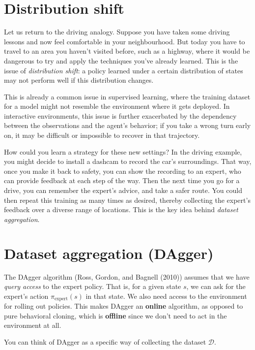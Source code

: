 \documentclass[
  letterpaper,
  DIV=11,
  numbers=noendperiod]{scrreprt}
\theoremstyle{plain}
\theoremstyle{plain}
\theoremstyle{definition}
\theoremstyle{definition}
\theoremstyle{remark}
\begin{document}
\section{Distribution shift}\label{distribution-shift}

Let us return to the driving analogy. Suppose you have taken some
driving lessons and now feel comfortable in your neighbourhood. But
today you have to travel to an area you haven't visited before, such as
a highway, where it would be dangerous to try and apply the techniques
you've already learned. This is the issue of \emph{distribution shift}:
a policy learned under a certain distribution of states may not perform
well if this distribution changes.

This is already a common issue in supervised learning, where the
training dataset for a model might not resemble the environment where it
gets deployed. In interactive environments, this issue is further
exacerbated by the dependency between the observations and the agent's
behavior; if you take a wrong turn early on, it may be difficult or
impossible to recover in that trajectory.

How could you learn a strategy for these new settings? In the driving
example, you might decide to install a dashcam to record the car's
surroundings. That way, once you make it back to safety, you can show
the recording to an expert, who can provide feedback at each step of the
way. Then the next time you go for a drive, you can remember the
expert's advice, and take a safer route. You could then repeat this
training as many times as desired, thereby collecting the expert's
feedback over a diverse range of locations. This is the key idea behind
\emph{dataset aggregation}.

\section{Dataset aggregation (DAgger)}\label{dataset-aggregation-dagger}

The DAgger algorithm (Ross, Gordon, and Bagnell (2010)) assumes that we
have \emph{query access} to the expert policy. That is, for a given
state \(s\), we can ask for the expert's action
\(\pi_{\text{expert}}(s)\) in that state. We also need access to the
environment for rolling out policies. This makes DAgger an
\textbf{online} algorithm, as opposed to pure behavioral cloning, which
is \textbf{offline} since we don't need to act in the environment at
all.

You can think of DAgger as a specific way of collecting the dataset
\(\mathcal{D}\).
\end{document}
